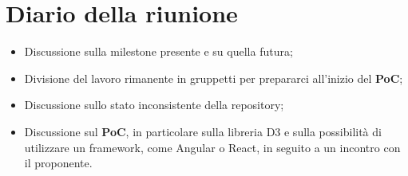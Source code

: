 \section{Diario della riunione}
\begin{itemize}
  \item Discussione sulla milestone presente e su quella futura;
  \item Divisione del lavoro rimanente in gruppetti per prepararci all'inizio del \textbf{PoC};
  \item Discussione sullo stato inconsistente della repository;
  \item Discussione sul \textbf{PoC}, in particolare sulla libreria D3 e sulla possibilità di utilizzare un framework, come Angular o React, in seguito a un incontro con il proponente.
   

\end{itemize}
